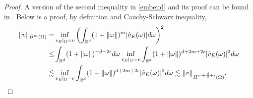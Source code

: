 \begin{proof}
 A version of the second inequality
  in \eqref{embend} and its proof 
can be found in \cite{barron1993universal}. Below is a proof, by 
definition and Cauchy-Schwarz
  inequality, 
\begin{align}
\|v\|_{B^m(\Omega)} =& \inf_{v_E |_{\Omega} = v} \left(\int_{\mathbb{R}^d}(1+\|\omega\|)^m|\hat{v}_E(\omega)|d\omega \right)^2
\\
\le &  \int_{\mathbb{R}^d}(1+\|\omega\|)^{-d - 2\epsilon}d\omega  \inf_{v_E |_{\Omega} = v} 
\int_{\mathbb{R}^d}(1+\|\omega\|)^{d + 2m + 2\epsilon} |\hat{v}_E(\omega)|^2d\omega  
\\
\lesssim &  \inf_{v_E |_{\Omega} = v} 
\int_{\mathbb{R}^d}(1+\|\omega\|)^{d + 2m + 2\epsilon} |\hat{v}_E(\omega)|^2d\omega  
\lesssim \|v\|_{H^{m + {d\over 2}+\epsilon}(\Omega)}.
\end{align}


\end{proof}


